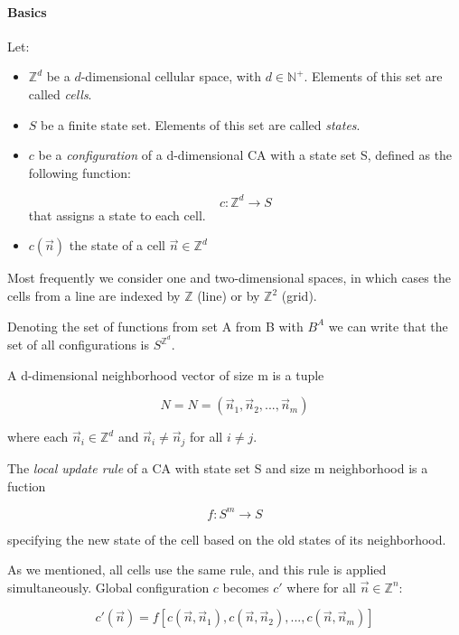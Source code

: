 \paragraph{Basics}
Let:

\begin{itemize}

	\item $\mathds{Z}^{d}$ be a $d$-dimensional cellular space, with $d \in \mathds{N}^{+}$. Elements of this set are called \textit{cells}.

	\item $S$ be a finite state set. Elements of this set are called \textit{states}.

	\item $c$ be a \textit{configuration} of a d-dimensional CA with a state set S, defined as the following function:

	$$c: \mathds{Z}^d \rightarrow S$$
	that assigns a state to each cell.

	\item $c(\vec{n })$ the state of a cell $\vec{n} \in \mathds{Z}^d$

\end{itemize}

Most frequently we consider one and two-dimensional spaces, in which cases the cells from a line are indexed by $\mathds{Z}$ (line) or by $\mathds{Z}^2$ (grid).

Denoting the set of functions from set A from B with $B^A$ we can write that the set of all configurations is $S^{\mathds{Z}^d}$.

A d-dimensional neighborhood vector of size m is a tuple

$$N = N = (\vec{n}_1,\vec{n}_2,...,\vec{n}_m) $$

where each $\vec{n}_i \in \mathds{Z}^d$ and $\vec{n}_i \neq \vec{n}_j$ for all $i \neq j$.

The \textit{local update rule} of a CA with state set S and size m neighborhood is a fuction

$$ f: S^m \rightarrow S$$

specifying the new state of the cell based on the old states of its neighborhood.

As we mentioned, all cells use the same rule, and this rule is applied simultaneously. Global configuration $c$ becomes $c'$ where for all $\vec{n} \in \mathds{Z}^n$:

$$c'(\vec{n}) = f[c(\vec{n}, \vec{n}_1),c(\vec{n}, \vec{n}_2), ... , c(\vec{n}, \vec{n}_m)]$$

